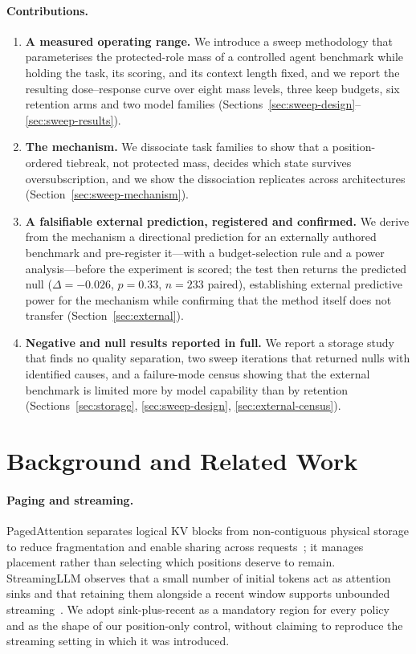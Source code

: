 \paragraph{Contributions.}
\begin{enumerate}
  \item \textbf{A measured operating range.}  We introduce a sweep methodology
  that parameterises the protected-role mass of a controlled agent benchmark
  while holding the task, its scoring, and its context length fixed, and we
  report the resulting dose--response curve over eight mass levels, three keep
  budgets, six retention arms and two model families
  (Sections~\ref{sec:sweep-design}--\ref{sec:sweep-results}).
  \item \textbf{The mechanism.}  We dissociate task families to show that a
  position-ordered tiebreak, not protected mass, decides which state survives
  oversubscription, and we show the dissociation replicates across
  architectures (Section~\ref{sec:sweep-mechanism}).
  \item \textbf{A falsifiable external prediction, registered and confirmed.}
  We derive from the mechanism a directional prediction for an externally
  authored benchmark and pre-register it---with a budget-selection rule and a
  power analysis---before the experiment is scored; the test then returns the
  predicted null ($\Delta=-0.026$, $p=0.33$, $n=233$ paired), establishing
  external predictive power for the mechanism while confirming that the method
  itself does not transfer (Section~\ref{sec:external}).
  \item \textbf{Negative and null results reported in full.}  We report a
  storage study that finds no quality separation, two sweep iterations that
  returned nulls with identified causes, and a failure-mode census showing that
  the external benchmark is limited more by model capability than by retention
  (Sections~\ref{sec:storage}, \ref{sec:sweep-design}, \ref{sec:external-census}).
\end{enumerate}

\section{Background and Related Work}
\label{sec:related}

\paragraph{Paging and streaming.}
PagedAttention separates logical KV blocks from non-contiguous physical storage
to reduce fragmentation and enable sharing across
requests~\cite{kwon2023pagedattention}; it manages placement rather than
selecting which positions deserve to remain.  StreamingLLM observes that a small
number of initial tokens act as attention sinks and that retaining them
alongside a recent window supports unbounded
streaming~\cite{xiao2024streamingllm}.  We adopt sink-plus-recent as a mandatory
region for every policy and as the shape of our position-only control, without
claiming to reproduce the streaming setting in which it was introduced.

